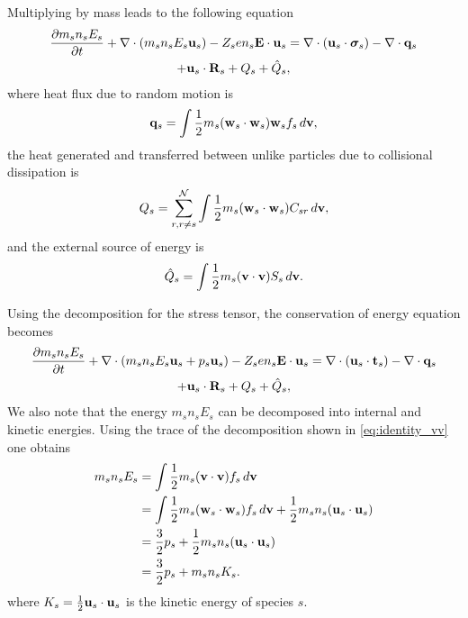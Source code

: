 \documentclass[a4paper,11pt]{report}
\begin{document}
Multiplying by mass leads to the following equation
\begin{multline}
\label{eq:energy_derv_5}
\frac{\partial m_s n_s E_s}{\partial t} + \nabla \cdot (m_s n_s E_s \mathbf{u}_s ) - Z_s e n_s \mathbf{E} \cdot \mathbf{u}_s = \nabla \cdot ( \mathbf{u}_s \cdot \boldsymbol{\sigma}_s ) - \nabla \cdot \mathbf{q}_s \\
+ \mathbf{u}_s \cdot \mathbf{R}_s + Q_{s} + \hat{Q}_s, 
\end{multline}
where heat flux due to random motion is
\begin{equation}
\mathbf{q}_s = \int \frac{1}{2} m_s (\mathbf{w}_s \cdot \mathbf{w}_s ) \mathbf{w}_s f_s \, d\mathbf{v},
\end{equation}
the heat generated and transferred between unlike particles due to collisional dissipation is 
\begin{equation}
Q_{s} = \sum_{r,r \ne s}^\mathcal{N} \int \frac{1}{2} m_s (\mathbf{w}_s \cdot \mathbf{w}_s) C_{s r} \, d\mathbf{v},
\end{equation}
and the external source of energy is
\begin{equation}
\hat{Q}_s = \int \frac{1}{2} m_s (\mathbf{v} \cdot \mathbf{v}) S_s \, d\mathbf{v}.
\end{equation}

Using the decomposition for the stress tensor, the conservation of energy equation becomes
\begin{multline}
\label{eq:energy_derv_6}
\frac{\partial m_s n_s E_s}{\partial t} + \nabla \cdot (m_s n_s E_s \mathbf{u}_s + p_s \mathbf{u}_s ) - Z_s e n_s \mathbf{E} \cdot \mathbf{u}_s = \nabla \cdot ( \mathbf{u}_s \cdot \mathbf{t}_s ) - \nabla \cdot \mathbf{q}_s \\
+ \mathbf{u}_s \cdot \mathbf{R}_s + Q_{s} + \hat{Q}_s, 
\end{multline}
We also note that the energy $m_s n_s E_s$ can be decomposed into internal and kinetic energies. Using the trace of the decomposition shown in \cref{eq:identity_vv} one obtains
\begin{align}
m_s n_s E_s & = \int \frac{1}{2} m_s (\mathbf{v} \cdot \mathbf{v}) f_s \, d\mathbf{v} \nonumber \\
& = \int \frac{1}{2} m_s (\mathbf{w}_s \cdot \mathbf{w}_s) f_s \, d\mathbf{v} + \frac{1}{2} m_s n_s (\mathbf{u}_s \cdot \mathbf{u}_s) \nonumber \\
& = \frac{3}{2} p_s + \frac{1}{2} m_s n_s (\mathbf{u}_s \cdot \mathbf{u}_s) \nonumber \\
& = \frac{3}{2} p_s + m_s n_s K_s.
\end{align}
where $K_s = \frac{1}{2} \mathbf{u}_s \cdot \mathbf{u}_s$ is the kinetic energy of species $s$.
\end{document}
